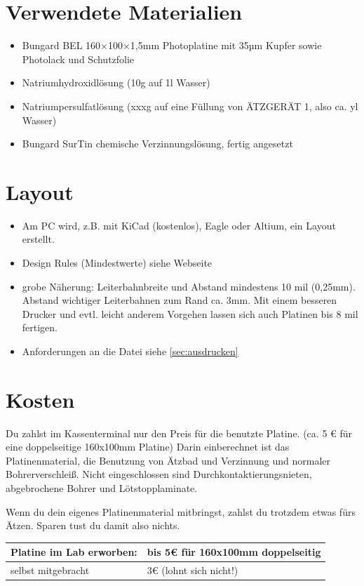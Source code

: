 \documentclass{\basedir/fablab-document}
\begin{document}
\section{Verwendete Materialien}
\begin{itemize}
\item Bungard BEL 160×100×1,5mm Photoplatine mit 35µm Kupfer sowie Photolack und Schutzfolie
\item Natriumhydroxidlösung (10g auf 1l Wasser)
\item Natriumpersulfatlösung (xxxg auf eine Füllung von ÄTZGERÄT 1, also ca. yl Wasser)
\item Bungard SurTin chemische Verzinnungslösung, fertig angesetzt
\end{itemize}
\section{Layout}
\begin{itemize}
\item Am PC wird, z.B. mit KiCad (kostenlos), Eagle oder Altium, ein Layout erstellt.
\item Design Rules (Mindestwerte) siehe Webseite
\item grobe Näherung: Leiterbahnbreite und Abstand mindestens 10 mil (0,25mm). Abstand wichtiger Leiterbahnen zum Rand ca. 3mm. Mit einem besseren Drucker und evtl. leicht anderem Vorgehen lassen sich auch Platinen bis 8 mil fertigen.
\item Anforderungen an die Datei siehe \ref{sec:ausdrucken}
\end{itemize}
\section{Kosten}
Du zahlst im Kassenterminal nur den Preis für die benutzte Platine. (ca. 5 € für eine doppelseitige 160x100mm Platine)
Darin einberechnet ist das Platinenmaterial, die Benutzung von Ätzbad und Verzinnung und normaler Bohrerverschleiß.
Nicht eingeschlossen sind Durchkontaktierungsnieten, abgebrochene Bohrer und Lötstopplaminate.

Wenn du dein eigenes Platinenmaterial mitbringst, zahlst du trotzdem etwas fürs Ätzen. Sparen tust du damit also nichts.

\begin{tabularx}{36em}{l|X}
Platine im Lab erworben: & bis 5€ für 160x100mm doppelseitig \\ \hline
selbst mitgebracht& 3€ (lohnt sich nicht!)
\end{tabularx}
\end{document}

